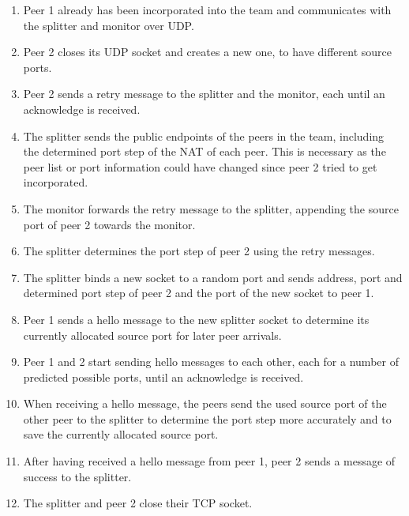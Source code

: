 \documentclass{article}
\begin{document}
\begin{enumerate}

\item Peer 1 already has been incorporated into the team and communicates
  with the splitter and monitor over UDP.

\item Peer 2 closes its UDP socket and creates a new one, to have
  different source ports.

\item Peer 2 sends a retry message to the splitter and the monitor, each
  until an acknowledge is received.

\item The splitter sends the public endpoints of the peers in the team,
  including the determined port step of the NAT of each peer. This is
  necessary as the peer list or port information could have changed
  since peer 2 tried to get incorporated.

\item The monitor forwards the retry message to the splitter, appending
  the source port of peer 2 towards the monitor.

\item The splitter determines the port step of peer 2 using the retry
  messages.

\item The splitter binds a new socket to a random port and sends address,
  port and determined port step of peer 2 and the port of the new
  socket to peer 1.

\item Peer 1 sends a hello message to the new splitter socket to determine
  its currently allocated source port for later peer arrivals.

\item Peer 1 and 2 start sending hello messages to each other, each for a
  number of predicted possible ports, until an acknowledge is
  received.

\item When receiving a hello message, the peers send the used source port
  of the other peer to the splitter to determine the port step more
  accurately and to save the currently allocated source port.

\item After having received a hello message from peer 1, peer 2 sends a
  message of success to the splitter.

\item The splitter and peer 2 close their TCP socket.

\end{enumerate}
\end{document}
